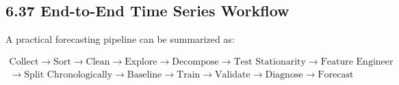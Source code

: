 \documentclass[
  10pt,
  letterpaper,
]{article}
\begin{document}
\hypertarget{time-series-workflow}{%
\subsection{6.37 End-to-End Time Series Workflow}\label{time-series-workflow}}

A practical forecasting pipeline can be summarized as:

\[
\boxed{
\begin{gathered}
\text{Collect} \rightarrow \text{Sort} \rightarrow \text{Clean} \rightarrow \text{Explore} \rightarrow \text{Decompose} \rightarrow \text{Test Stationarity} \rightarrow \text{Feature Engineer} \\
\rightarrow \text{Split Chronologically} \rightarrow \text{Baseline} \rightarrow \text{Train} \rightarrow \text{Validate} \rightarrow \text{Diagnose} \rightarrow \text{Forecast}
\end{gathered}
}
\]
\end{document}
